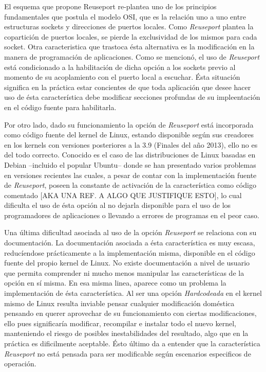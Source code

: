 El esquema que propone Reuseport re-plantea uno de los principios fundamentales que postula el modelo OSI, que es la relación uno a uno entre estructuras sockets y direcciones de puertos locales. Como \emph{Reuseport} plantea la copartición de puertos locales, se pierde la exclusividad de los mismos para cada socket. Otra caracteristica que trastoca ésta alternativa es la modificación en la manera de programación de aplicaciones. Como se mencionó, el uso de \emph{Reuseport} está condicionado a la habilitación de dicha opción a los sockets previo al momento de su acoplamiento con el puerto local a escuchar. Ésta situación significa en la práctica estar concientes de que toda aplicación que desee hacer uso de ésta característica debe modificar secciones profundas de su impleentación en el código fuente para habilitarla.

Por otro lado, dado su funcionamiento la opción de \emph{Reuseport} está incorporada como código fuente del kernel de Linux, estando disponible según sus creadores en los kernels con versiones posteriores a la 3.9 (Finales del año 2013), ello no es del todo correcto. Conocido es el caso de las distribuciones de Linux basadas en Debian --incluido el popular Ubuntu-- donde se han presentado varios problemas en versiones recientes las cuales, a pesar de contar con la implementación fuente de \emph{Reuseport}, poseen la constante de activación de la característica como código comentado [AKA UNA REF. A ALGO QUE JUSTIFIQUE ESTO], lo cual dificulta el uso de ésta opción al no dejarla disponible para el uso de los programadores de aplicaciones o llevando a errores de programas en el peor caso.

Una última dificultad asociada al uso de la opción \emph{Reuseport} se relaciona con su documentación. La documentación asociada a ésta característica es muy escasa, reducíendose prácticamente a la implementación misma, disponible en el código fuente del propio kernel de Linux. No existe documentación a nivel de usuario que permita comprender ni mucho menos manipular las características de la opción en sí misma. En esa misma linea, aparece como un problema la implementación de ésta característica. Al ser una opción \emph{Hardcodeada} en el kernel mismo de Linux resulta inviable pensar cualquier modificación doméstica pensando en querer aprovechar de su funcionamiento con ciertas modificaciones, ello pues significaría modificar, recompilar e instalar todo el nuevo kernel, manteniendo el riesgo de posibles inestabilidades del resultado, algo que en la práctica es dificilmente aceptable. Ésto último da a entender que la característica \emph{Reuseport} no está pensada para ser modificable según escenarios especificos de operación.